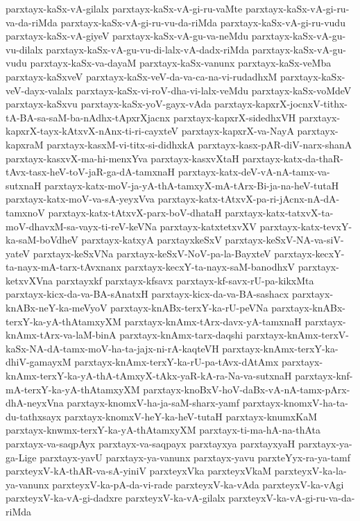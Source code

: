 {parxtayx-kaSx-vA-gilalx
parxtayx-kaSx-vA-gi-ru-vaMte
parxtayx-kaSx-vA-gi-ru-va-da-riMda
parxtayx-kaSx-vA-gi-ru-vu-da-riMda
parxtayx-kaSx-vA-gi-ru-vudu
parxtayx-kaSx-vA-giyeV
parxtayx-kaSx-vA-gu-va-neMdu
parxtayx-kaSx-vA-gu-vu-dilalx
parxtayx-kaSx-vA-gu-vu-di-lalx-vA-dadx-riMda
parxtayx-kaSx-vA-gu-vudu
parxtayx-kaSx-va-dayaM
parxtayx-kaSx-vanunx
parxtayx-kaSx-veMba
parxtayx-kaSxveV
parxtayx-kaSx-veV-da-va-ca-na-vi-rudadhxM
parxtayx-kaSx-veV-dayx-valalx
parxtayx-kaSx-vi-roV-dha-vi-lalx-veMdu
parxtayx-kaSx-voMdeV
parxtayx-kaSxvu
parxtayx-kaSx-yoV-gayx-vAda
parxtayx-kapxrX-jocnxV-tithx-tA-BA-sa-saM-ba-nAdhx-tApxrXjacnx
parxtayx-kapxrX-sidedhxVH
parxtayx-kapxrX-tayx-kAtxvX-nAnx-ti-ri-cayxteV
parxtayx-kapxrX-va-NayA
parxtayx-kapxraM
parxtayx-kasxM-vi-titx-si-didhxkA
parxtayx-kasx-pAR-diV-narx-shanA
parxtayx-kasxvX-ma-hi-menxYva
parxtayx-kasxvXtaH
parxtayx-katx-da-thaR-tAvx-tasx-heV-toV-jaR-ga-dA-tamxnaH
parxtayx-katx-deV-vA-nA-tamx-va-sutxnaH
parxtayx-katx-moV-ja-yA-thA-tamxyX-mA-tArx-Bi-ja-na-heV-tutaH
parxtayx-katx-moV-va-sA-yeyxVva
parxtayx-katx-tAtxvX-pa-ri-jAcnx-nA-dA-tamxnoV
parxtayx-katx-tAtxvX-parx-boV-dhataH
parxtayx-katx-tatxvX-ta-moV-dhavxM-sa-vayx-ti-reV-keVNa
parxtayx-katxtetxvXV
parxtayx-katx-tevxY-ka-saM-boVdheV
parxtayx-katxyA
parxtayxkeSxV
parxtayx-keSxV-NA-va-siV-yateV
parxtayx-keSxVNa
parxtayx-keSxV-NoV-pa-la-BayxteV
parxtayx-kecxY-ta-nayx-mA-tarx-tAvxnanx
parxtayx-kecxY-ta-nayx-saM-banodhxV
parxtayx-ketxvXVna
parxtayxkf
parxtayx-kfsavx
parxtayx-kf-savx-rU-pa-kikxMta
parxtayx-kicx-da-va-BA-sAnatxH
parxtayx-kicx-da-va-BA-sashacx
parxtayx-knABx-neY-ka-meVyoV
parxtayx-knABx-terxY-ka-rU-peVNa
parxtayx-knABx-terxY-ka-yA-thAtamxyXM
parxtayx-knAmx-tArx-davx-yA-tamxnaH
parxtayx-knAmx-tArx-va-laM-binA
parxtayx-knAmx-tarx-daqshi
parxtayx-knAmx-terxV-kaSx-NA-dA-tamx-moV-ha-ta-jajx-ni-rA-kaqteVH
parxtayx-knAmx-terxY-ka-dhiV-gamayxM
parxtayx-knAmx-terxY-ka-rU-pa-tAvx-dAtAmx
parxtayx-knAmx-terxY-ka-yA-thA-tAmxyX-tAkx-yaR-kA-ra-Na-va-sutxnaH
parxtayx-knf-mA-terxY-ka-yA-thAtamxyXM
parxtayx-knoBxV-hoV-daBx-vA-nA-tamx-pArx-dhA-neyxVna
parxtayx-knomxV-ha-ja-saM-sharx-yamf
parxtayx-knomxV-ha-ta-du-tathxsayx
parxtayx-knomxV-heY-ka-heV-tutaH
parxtayx-knumxKaM
parxtayx-knwmx-terxY-ka-yA-thAtamxyXM
parxtayx-ti-ma-hA-na-thAta
parxtayx-va-saqpAyx
parxtayx-va-saqpayx
parxtayxya
parxtayxyaH
parxtayx-ya-ga-Lige
parxtayx-yavU
parxtayx-ya-vanunx
parxtayx-yavu
parxteYyx-ra-ya-tamf
parxteyxV-kA-thAR-va-sA-yiniV
parxteyxVka
parxteyxVkaM
parxteyxV-ka-la-ya-vanunx
parxteyxV-ka-pA-da-vi-rade
parxteyxV-ka-vAda
parxteyxV-ka-vAgi
parxteyxV-ka-vA-gi-dadxre
parxteyxV-ka-vA-gilalx
parxteyxV-ka-vA-gi-ru-va-da-riMda
}
